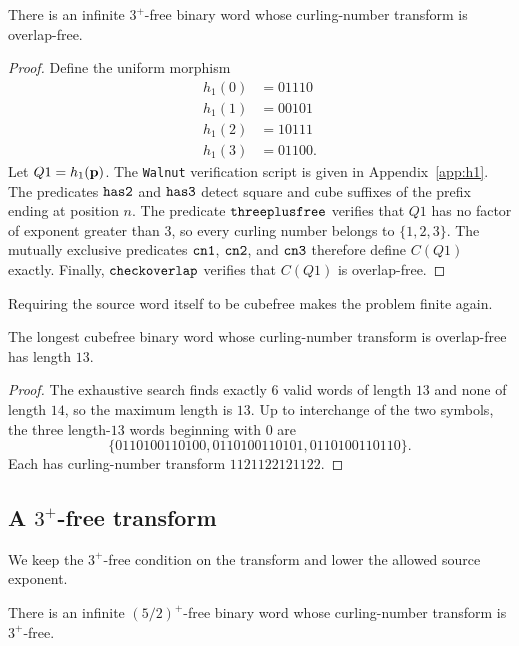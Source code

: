 \documentclass[12pt,reqno]{article}
\begin{document}
\begin{theorem} 
\label{thm:binary-threeplus-overlap}
There is an infinite $3^+$-free binary word whose curling-number transform is overlap-free. 
\end{theorem}

\begin{proof} 
Define the uniform morphism
\begin{align*} 
h_1(0) &= 01110 \\
h_1(1) &= 00101 \\
h_1(2) &= 10111 \\
h_1(3) &= 01100 . 
\end{align*}
Let $Q1=h_1({\bf p})$.  The {\tt Walnut} verification script is given in Appendix~\ref{app:h1}.  The predicates ${\tt has2}$ and ${\tt has3}$ detect square and cube suffixes of the prefix ending at position $n$.  The predicate ${\tt threeplusfree}$ verifies that $Q1$ has no factor of exponent greater than $3$, so every curling number belongs to $\{1,2,3\}$.  The mutually exclusive predicates ${\tt cn1}$, ${\tt cn2}$, and ${\tt cn3}$ therefore define $C(Q1)$ exactly.  Finally, ${\tt checkoverlap}$ verifies that $C(Q1)$ is overlap-free.
\end{proof}

Requiring the source word itself to be cubefree makes the problem finite again.

\begin{theorem} 
\label{thm:binary-cube-overlap-max}
The longest cubefree binary word whose curling-number transform is overlap-free has length $13$. 
\end{theorem}

\begin{proof} 
The exhaustive search finds exactly $6$ valid words of length $13$ and none of length $14$, so the maximum length is $13$.  Up to interchange of the two symbols, the three length-$13$ words beginning with $0$ are
$$\{0110100110100, 0110100110101, 0110100110110\}.$$
Each has curling-number transform $1121122121122$.
\end{proof}

\subsection{\texorpdfstring{A $3^+$-free transform}{A 3+-free transform}}

We keep the $3^+$-free condition on the transform and lower the allowed source exponent.

\begin{theorem} 
\label{thm:binary-52plus-3plus}
There is an infinite $(5/2)^+$-free binary word whose curling-number transform is $3^+$-free. 
\end{theorem}
\end{document}
